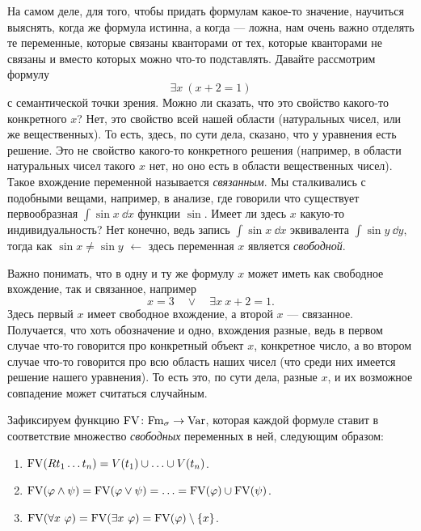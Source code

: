 На самом деле, для того, чтобы придать формулам какое-то значение, научиться выяснять, когда же формула истинна, а когда --- ложна, нам очень важно отделять те переменные, которые связаны кванторами от тех, которые кванторами не связаны и вместо которых можно что-то подставлять.
Давайте рассмотрим формулу
$$
    \exists x~(x + 2 = 1)
$$
с семантической точки зрения.
Можно ли сказать, что это свойство какого-то конкретного $x$?
Нет, это свойство всей нашей области (натуральных чисел, или же вещественных).
То есть, здесь, по сути дела, сказано, что у уравнения есть решение.
Это не свойство какого-то конкретного решения (например, в области натуральных чисел такого $x$ нет, но оно есть в области вещественных чисел).
Такое вхождение переменной называется {\it связанным}.
Мы сталкивались с подобными вещами, например, в анализе, где говорили что существует первообразная $\int \sin x \ \dd x$ функции $\sin$.
Имеет ли здесь $x$ какую-то индивидуальность?
Нет конечно, ведь запись $\int \sin x \ \dd x$ эквивалента $\int \sin y \ \dd y$, тогда как $\sin x \neq \sin y$ $\leftarrow$ здесь переменная $x$ является {\it свободной}.

Важно понимать, что в одну и ту же формулу $x$ может иметь как свободное вхождение, так и связанное, например
$$
    x = 3 \quad \lor \quad \exists x~x + 2 = 1.
$$
Здесь первый $x$ имеет свободное вхождение, а второй $x$ --- связанное.
Получается, что хоть обозначение и одно, вхождения разные, ведь в первом случае что-то говорится про конкретный объект $x$, конкретное число, а во втором случае что-то говорится про всю область наших чисел (что среди них имеется решение нашего уравнения).
То есть это, по сути дела, разные $x$, и их возможное совпадение может считаться случайным.

\begin{definition}
    Зафиксируем функцию $\mathrm{FV} \colon \mathrm{Fm}_{\sigma} \to \mathrm{Var}$, которая каждой формуле ставит в соответствие множество {\it свободных} переменных в ней, следующим образом:
    \begin{enumerate}
        \item $\mathrm{FV}(R t_{1} \ldots t_{n}) = V(t_{1}) \cup \ldots \cup V(t_{n})$.
        \item $\mathrm{FV}(\varphi \land \psi) = \mathrm{FV}(\varphi \lor \psi) = \ldots = \mathrm{FV}(\varphi) \cup \mathrm{FV}(\psi)$.
        \item $\mathrm{FV}(\forall x~\varphi) = \mathrm{FV}(\exists x~\varphi) = \mathrm{FV}(\varphi) \setminus \{x\}$.
    \end{enumerate}
\end{definition}

